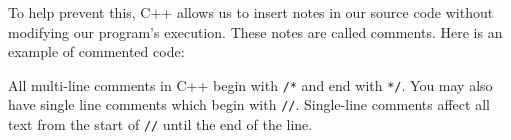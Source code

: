 \documentclass[a4paper,12pt]{article}
\begin{document}
To help prevent this, C++ allows us to insert notes in our source code without modifying our program's execution. These notes are called comments. Here is an example of commented code:

\newpage



\newpage

All multi-line comments in C++ begin with \texttt{/*} and end with \texttt{*/}. You may also have single line comments which begin with \texttt{//}. Single-line comments affect all text from the start of \texttt{//} until the end of the line.
\end{document}
